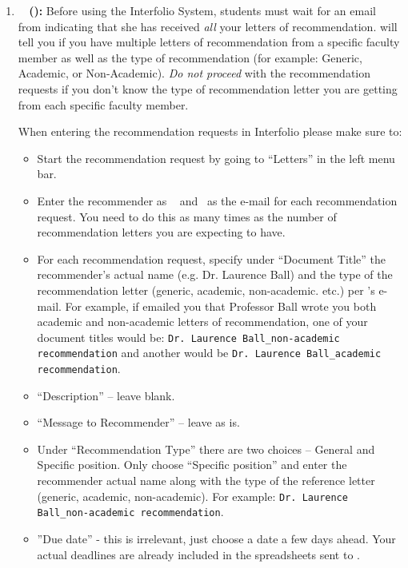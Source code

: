 \documentclass{\econtex}
\begin{document}
\begin{enumerate}
\hypertarget{students-interfolio}{}
\item \textbf{\Interfolio ~ (\InterfolioLink):}
  Before using the Interfolio System, students must wait for an email from {\JMStaffName} indicating that she has received \textit{all} your letters of recommendation. {\JMStaffName} will tell you if you have multiple letters of recommendation from a specific faculty member as well as the type of recommendation (for example: Generic, Academic, or Non-Academic). \textit{Do not proceed} with the recommendation requests if you don't know the type of recommendation letter you are getting from each specific faculty member.

  When entering the recommendation requests in Interfolio please make sure to:
  \begin{itemize}
  \item Start the recommendation request by going to ``Letters'' in the left menu bar.
  \item Enter the recommender as {\JMStaffName}~{\JMStaffNameLast} and \jmstaffemail~as the e-mail for each recommendation request. You need to do this as many times as the number of recommendation letters you are expecting to have.
  \item For each recommendation request, specify under ``Document Title'' the recommender's actual name (e.g. Dr. Laurence Ball) and the type of the recommendation letter (generic, academic, non-academic. etc.) per {\JMStaffName}'s e-mail. For example, if {\JMStaffName} emailed you that Professor Ball wrote you both academic and non-academic letters of recommendation, one of your document titles would be: \texttt{Dr. Laurence Ball\_non-academic recommendation} and another would be \texttt{Dr. Laurence Ball\_academic recommendation}.
  \item ``Description'' -- leave blank.
  \item ``Message to Recommender'' -- leave as is.
  \item Under ``Recommendation Type'' there are two choices -- General and Specific position. Only choose ``Specific position'' and enter the recommender actual name along with the type of the reference letter (generic, academic, non-academic). For example: \texttt{Dr. Laurence Ball\_non-academic recommendation}.
  \item ''Due date''  - this is irrelevant, just choose a date a few days ahead. Your actual deadlines are already included in the spreadsheets sent to {\JMStaffName}. 
  \end{itemize}


\end{enumerate}
\end{document}
